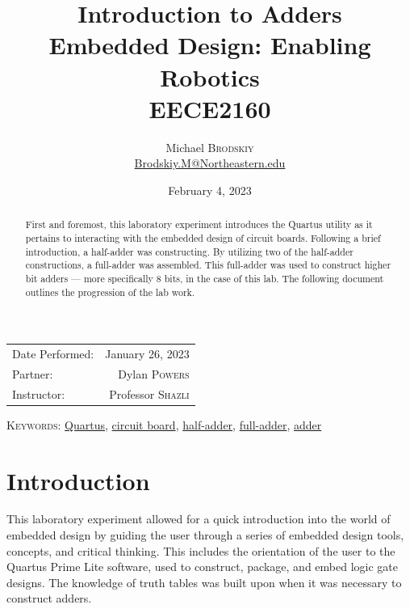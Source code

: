 \documentclass[
	letterpaper, %
	10pt, %
]{CSUniSchoolLabReport}
\title{Introduction to Adders \\ Embedded Design: Enabling Robotics \\ EECE2160} %
\author{Michael \textsc{Brodskiy}\\ \small \href{mailto:Brodskiy.M@Northeastern.edu}{Brodskiy.M@Northeastern.edu}}
\date{February 4, 2023} %
\begin{document}
\maketitle %

\begin{center}
	\begin{tabular}{l r}
		Date Performed: & January 26, 2023 \\ %
        Partner: & Dylan \textsc{Powers} \\ %
		Instructor: & Professor \textsc{Shazli} %
	\end{tabular}
\end{center}

\newpage

\begin{abstract}

  First and foremost, this laboratory experiment introduces the Quartus utility as it pertains to interacting with the embedded design of circuit boards. Following a brief introduction, a half-adder was constructing. By utilizing two of the half-adder constructions, a full-adder was assembled. This full-adder was used to construct higher bit adders — more specifically 8 bits, in the case of this lab. The following document outlines the progression of the lab work.

\end{abstract}

\begin{flushleft}

  \textsc{Keywords:} \underline{Quartus}, \underline{circuit board}, \underline{half-adder}, \underline{full-adder}, \underline{adder}

\end{flushleft}

\newpage

\section{Introduction}

\hspace{.5 in}    This laboratory experiment allowed for a quick introduction into the world of embedded design by guiding the user through a series of embedded design tools, concepts, and critical thinking. This includes the orientation of the user to the Quartus Prime Lite software, used to construct, package, and embed logic gate designs. The knowledge of truth tables was built upon when it was necessary to construct adders.\newline
\end{document}
